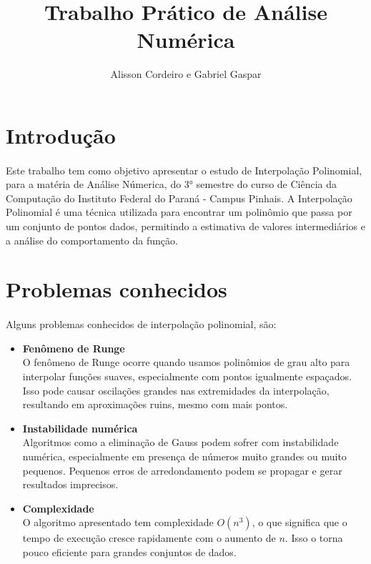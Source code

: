 \documentclass{article}
\title{Trabalho Prático de Análise Numérica}
\author{Alisson Cordeiro e Gabriel Gaspar}
\date{}
\begin{document}
\maketitle

\section{Introdução}
\paragraph{} Este trabalho tem como objetivo apresentar o estudo de Interpolação Polinomial, para a matéria de Análise Númerica, do 3° semestre do curso de Ciência da Computação do Instituto Federal do Paraná - Campus Pinhais. A Interpolação Polinomial é uma técnica utilizada para encontrar um polinômio que passa por um conjunto de pontos dados, permitindo a estimativa de valores intermediários e a análise do comportamento da função.

\section{Problemas conhecidos}
\paragraph{} Alguns problemas conhecidos de interpolação polinomial, são:

\begin{itemize}

    \item \textbf{Fenômeno de Runge}\\
    O fenômeno de Runge ocorre quando usamos polinômios de grau alto para interpolar funções suaves, especialmente com pontos igualmente espaçados. Isso pode causar oscilações grandes nas extremidades da interpolação, resultando em aproximações ruins, mesmo com mais pontos.

    \item \textbf{Instabilidade numérica}\\
    Algoritmos como a eliminação de Gauss podem sofrer com instabilidade numérica, especialmente em presença de números muito grandes ou muito pequenos. Pequenos erros de arredondamento podem se propagar e gerar resultados imprecisos.

    \item \textbf{Complexidade}\\
    O algoritmo apresentado tem complexidade \( O(n^3) \), o que significa que o tempo de execução cresce rapidamente com o aumento de \( n \). Isso o torna pouco eficiente para grandes conjuntos de dados.

\end{itemize}
\end{document}

